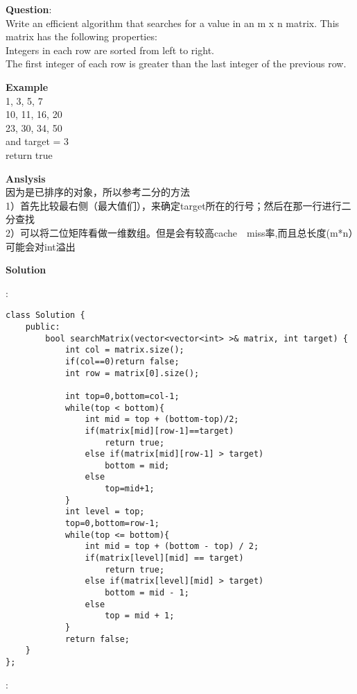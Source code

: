     
\begin{description}
    \item{\textbf{Question}}:\\%
		Write an efficient algorithm that searches for a value in an m x n matrix. This matrix has the following properties:\\
		Integers in each row are sorted from left to right.\\
		The first integer of each row is greater than the last integer of the previous row.\\

    \item{\textbf{Example}}\\
		{1,   3,  5,  7}\\
		{10, 11, 16, 20}\\
		{23, 30, 34, 50}\\
		and target = 3\\

		return true\\
    \item{\textbf{Anslysis}}\\
		因为是已排序的对象，所以参考二分的方法\\
		1）首先比较最右侧（最大值们），来确定target所在的行号；然后在那一行进行二分查找\\
		2）可以将二位矩阵看做一维数组。但是会有较高cache　miss率,而且总长度(m*n）可能会对int溢出\\

    \item{\textbf{Solution}}\\
	\item{} : \\
		\begin{lstlisting}
class Solution {
	public:
		bool searchMatrix(vector<vector<int> >& matrix, int target) {
			int col = matrix.size();
			if(col==0)return false;
			int row = matrix[0].size();

			int top=0,bottom=col-1;
			while(top < bottom){
				int mid = top + (bottom-top)/2;
				if(matrix[mid][row-1]==target)	
					return true;
				else if(matrix[mid][row-1] > target)	
					bottom = mid;
				else	
					top=mid+1;
			}
			int level = top;
			top=0,bottom=row-1;
			while(top <= bottom){
				int mid = top + (bottom - top) / 2;
				if(matrix[level][mid] == target)
					return true;
				else if(matrix[level][mid] > target)
					bottom = mid - 1;
				else 
					top = mid + 1;
			}
			return false;
	}
};
		\end{lstlisting}
	\item{} : \\
		\begin{lstlisting}


\end{lstlisting}
\end{description}
